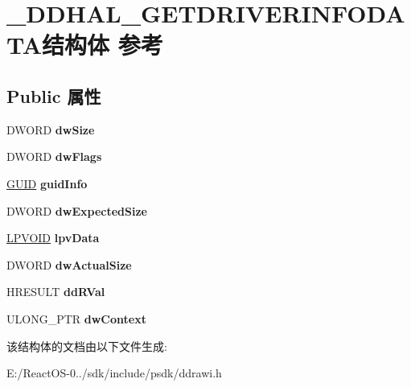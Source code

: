 \hypertarget{struct___d_d_h_a_l___g_e_t_d_r_i_v_e_r_i_n_f_o_d_a_t_a}{}\section{\+\_\+\+D\+D\+H\+A\+L\+\_\+\+G\+E\+T\+D\+R\+I\+V\+E\+R\+I\+N\+F\+O\+D\+A\+T\+A结构体 参考}
\label{struct___d_d_h_a_l___g_e_t_d_r_i_v_e_r_i_n_f_o_d_a_t_a}
\subsection*{Public 属性}
\begin{DoxyCompactItemize}
\item 
\mbox{\label{struct___d_d_h_a_l___g_e_t_d_r_i_v_e_r_i_n_f_o_d_a_t_a_af01fe5145e57e4c6f5925c06882eacae}} 
D\+W\+O\+RD {\bfseries dw\+Size}
\item 
\mbox{\label{struct___d_d_h_a_l___g_e_t_d_r_i_v_e_r_i_n_f_o_d_a_t_a_af402517a162877cc6eb74696092f208b}} 
D\+W\+O\+RD {\bfseries dw\+Flags}
\item 
\mbox{\label{struct___d_d_h_a_l___g_e_t_d_r_i_v_e_r_i_n_f_o_d_a_t_a_a66a8112ebf77f598e5b628ad19467e43}} 
\hyperlink{interface_g_u_i_d}{G\+U\+ID} {\bfseries guid\+Info}
\item 
\mbox{\label{struct___d_d_h_a_l___g_e_t_d_r_i_v_e_r_i_n_f_o_d_a_t_a_a58288f9c26428fb7b17d2a28b4066b79}} 
D\+W\+O\+RD {\bfseries dw\+Expected\+Size}
\item 
\mbox{\label{struct___d_d_h_a_l___g_e_t_d_r_i_v_e_r_i_n_f_o_d_a_t_a_a39ca86989ca6b78e1dd25367b11c36fe}} 
\hyperlink{interfacevoid}{L\+P\+V\+O\+ID} {\bfseries lpv\+Data}
\item 
\mbox{\label{struct___d_d_h_a_l___g_e_t_d_r_i_v_e_r_i_n_f_o_d_a_t_a_a104d56dfa3bc03b961e29fa6c1987f0d}} 
D\+W\+O\+RD {\bfseries dw\+Actual\+Size}
\item 
\mbox{\label{struct___d_d_h_a_l___g_e_t_d_r_i_v_e_r_i_n_f_o_d_a_t_a_a13ac4dae7047c4efcbd5302fad2a0f03}} 
H\+R\+E\+S\+U\+LT {\bfseries dd\+R\+Val}
\item 
\mbox{\label{struct___d_d_h_a_l___g_e_t_d_r_i_v_e_r_i_n_f_o_d_a_t_a_a6d79a76b2107e17930b8a36c1073e84c}} 
U\+L\+O\+N\+G\+\_\+\+P\+TR {\bfseries dw\+Context}
\end{DoxyCompactItemize}


该结构体的文档由以下文件生成\+:\begin{DoxyCompactItemize}
\item 
E\+:/\+React\+O\+S-\/0../sdk/include/psdk/ddrawi.\+h\end{DoxyCompactItemize}

